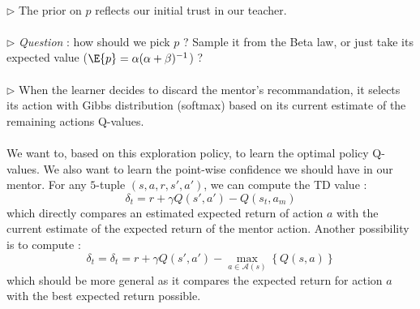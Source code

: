 \documentclass[a4paper]{report}
\begin{document}
{{{{\begin{minipage}{0.95\linewidth}
\begin{leftbar}
						\paragraph{} \noindent $\triangleright$ The prior on $p$ reflects our initial trust in our teacher. \\
						\paragraph{} \noindent $\triangleright$ \emph{Question} : how should we pick $p$ ? Sample it from the Beta law, or just take its expected value ($\E{p} = \alpha (\alpha + \beta)^{-1}$) ? \\
						\paragraph{} \noindent $\triangleright$ When the learner decides to discard the mentor's recommandation, it selects its action with Gibbs distribution (softmax) based on its current estimate of the remaining actions Q-values. 
				\end{leftbar}
			\end{minipage}
		
			\paragraph{} We want to, based on this exploration policy, to learn the optimal policy Q-values. We also want to learn the point-wise confidence we should have in our mentor. For any $5$-tuple $(s,a,r,s',a')$, we can compute the TD value : 
			\begin{equation}
				\delta_t = r + \gamma Q(s',a') - Q(s_t,a_m)
			\end{equation}
			which directly compares an estimated expected return of action $a$ with the current estimate of the expected return of the mentor action. Another possibility is to compute : 
			\begin{equation}
				\delta_t = \delta_t = r + \gamma Q(s',a') - \max_{a\in\mathcal{A}(s)}{\left\{ Q(s,a)\right\}}
			\end{equation}
			which should be more general as it compares the expected return for action $a$ with the best expected return possible. 
		
}}}}
\end{document}

